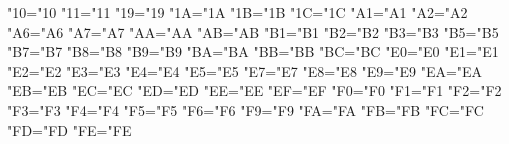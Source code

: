\lccode"10="10 %
\lccode"11="11 %
\lccode"19="19 %
\lccode"1A="1A %
\lccode"1B="1B %
\lccode"1C="1C %
\lccode"A1="A1 %
\lccode"A2="A2 %
\lccode"A6="A6 %
\lccode"A7="A7 %
\lccode"AA="AA %
\lccode"AB="AB %
\lccode"B1="B1 %
\lccode"B2="B2 %
\lccode"B3="B3 %
\lccode"B5="B5 %
\lccode"B7="B7 %
\lccode"B8="B8 %
\lccode"B9="B9 %
\lccode"BA="BA %
\lccode"BB="BB %
\lccode"BC="BC %
\lccode"E0="E0 %
\lccode"E1="E1 %
\lccode"E2="E2 %
\lccode"E3="E3 %
\lccode"E4="E4 %
\lccode"E5="E5 %
\lccode"E7="E7 %
\lccode"E8="E8 %
\lccode"E9="E9 %
\lccode"EA="EA %
\lccode"EB="EB %
\lccode"EC="EC %
\lccode"ED="ED %
\lccode"EE="EE %
\lccode"EF="EF %
\lccode"F0="F0 %
\lccode"F1="F1 %
\lccode"F2="F2 %
\lccode"F3="F3 %
\lccode"F4="F4 %
\lccode"F5="F5 %
\lccode"F6="F6 %
\lccode"F9="F9 %
\lccode"FA="FA %
\lccode"FB="FB %
\lccode"FC="FC %
\lccode"FD="FD %
\lccode"FE="FE %

